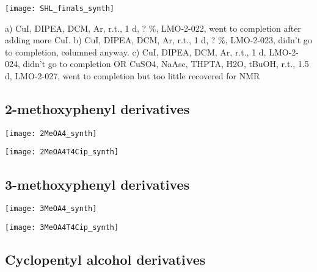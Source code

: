 \begin{scheme}[H]
	\begin{center}
		\texttt{[image: SHL\_finals\_synth]}
		\caption{a) CuI, DIPEA, DCM, Ar, r.t., 1 d, ? \%, LMO-2-022, went to completion after adding more CuI.
			b) CuI, DIPEA, DCM, Ar, r.t., 1 d, ? \%, LMO-2-023, didn't go to completion, columned anyway.
			c) CuI, DIPEA, DCM, Ar, r.t., 1 d, LMO-2-024, didn't go to completion
			OR CuSO4, NaAsc, THPTA, H2O, tBuOH, r.t., 1.5 d, LMO-2-027, went to completion but too little recovered for NMR\label{sch:}}
	\end{center}
\end{scheme}


\subsection{2-methoxyphenyl derivatives}

\begin{scheme}[H]
	\begin{center}
		\texttt{[image: 2MeOA4\_synth]}
		\caption{\label{sch:}}
	\end{center}
\end{scheme}

\begin{scheme}[H]
	\begin{center}
		\texttt{[image: 2MeOA4T4Cip\_synth]}
		\caption{\label{sch:}}
	\end{center}
\end{scheme}

\subsection{3-methoxyphenyl derivatives}

\begin{scheme}[H]
	\begin{center}
		\texttt{[image: 3MeOA4\_synth]}
		\caption{\label{sch:}}
	\end{center}
\end{scheme}

\begin{scheme}[H]
	\begin{center}
		\texttt{[image: 3MeOA4T4Cip\_synth]}
		\caption{\label{sch:}}
	\end{center}
\end{scheme}

\subsection{Cyclopentyl alcohol derivatives}

